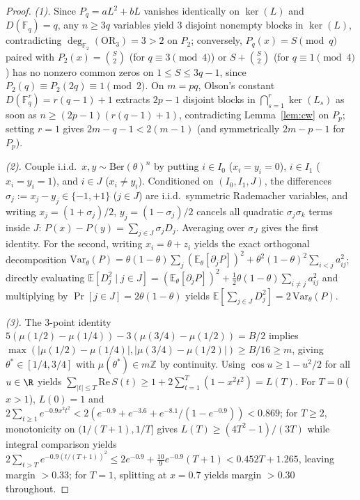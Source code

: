 \documentclass[11pt,a4paper]{article}
\theoremstyle{definition}
\newcommand{\F}{\mathbb{F}}
\newcommand{\Z}{\mathbb{Z}}
\newcommand{\OR}{\mathrm{OR}}
\begin{document}
\begin{proof}
\emph{(1).} Since $P_q = a L^2 + b L$ vanishes identically on $\ker(L)$ and $D(\F_q) = q$, any $n \ge 3q$ variables yield $3$ disjoint nonempty blocks in $\ker(L)$, contradicting $\deg_{\F_2}(\OR_3) = 3 > 2$ on $P_2$; conversely, $P_q(x) = S \pmod q$ paired with $P_2(x) = \binom{S}{2}$ (for $q \equiv 3 \pmod 4$) or $S + \binom{S}{2}$ (for $q \equiv 1 \pmod 4$) has no nonzero common zeros on $1 \le S \le 3q - 1$, since $P_2(q) \equiv P_2(2q) \equiv 1 \pmod 2$. On $m = pq$, Olson's constant $D(\F_q^r) = r(q - 1) + 1$ extracts $2p - 1$ disjoint blocks in $\bigcap_{s=1}^r \ker(L_s)$ as soon as $n \ge (2p - 1)(r(q - 1) + 1)$, contradicting Lemma~\ref{lem:cw} on $P_p$; setting $r = 1$ gives $2m - q - 1 < 2(m - 1)$ (and symmetrically $2m - p - 1$ for $P_p$).

\emph{(2).} Couple i.i.d.\ $x, y \sim \mathrm{Ber}(\theta)^n$ by putting $i \in I_0$ ($x_i = y_i = 0$), $i \in I_1$ ($x_i = y_i = 1$), and $i \in J$ ($x_i \ne y_i$). Conditioned on $(I_0, I_1, J)$, the differences $\sigma_j := x_j - y_j \in \{-1, +1\}$ ($j \in J$) are i.i.d.\ symmetric Rademacher variables, and writing $x_j = (1 + \sigma_j)/2$, $y_j = (1 - \sigma_j)/2$ cancels all quadratic $\sigma_j\sigma_k$ terms inside $J$: $P(x) - P(y) = \sum_{j \in J} \sigma_j D_j$. Averaging over $\sigma_J$ gives the first identity. For the second, writing $x_i = \theta + z_i$ yields the exact orthogonal decomposition $\mathrm{Var}_\theta(P) = \theta(1-\theta)\sum_j (\mathbb{E}_\theta[\partial_j P])^2 + \theta^2(1-\theta)^2 \sum_{i<j} a_{ij}^2$; directly evaluating $\mathbb{E}[D_j^2 \mid j \in J] = (\mathbb{E}_\theta[\partial_j P])^2 + \frac{1}{2}\theta(1-\theta)\sum_{i\ne j} a_{ij}^2$ and multiplying by $\Pr[j \in J] = 2\theta(1-\theta)$ yields $\mathbb{E}[\sum_{j \in J} D_j^2] = 2\,\mathrm{Var}_\theta(P)$.

\emph{(3).} The $3$-point identity $5(\mu(1/2) - \mu(1/4)) - 3(\mu(3/4) - \mu(1/2)) = B/2$ implies $\max(|\mu(1/2)-\mu(1/4)|, |\mu(3/4)-\mu(1/2)|) \ge B/16 \ge m$, giving $\theta^* \in [1/4, 3/4]$ with $\mu(\theta^*) \in m\Z$ by continuity. Using $\cos u \ge 1 - u^2/2$ for all $u \in \R$ yields $\sum_{|t| \le T} \mathrm{Re}\, S(t) \ge 1 + 2\sum_{t=1}^T (1 - x^2 t^2) = L(T)$. For $T = 0$ ($x > 1$), $L(0) = 1$ and $2\sum_{t \ge 1} e^{-0.9 x^2 t^2} < 2(e^{-0.9} + e^{-3.6} + e^{-8.1}/(1-e^{-0.9})) < 0.869$; for $T \ge 2$, monotonicity on $(1/(T+1), 1/T]$ gives $L(T) \ge (4T^2 - 1)/(3T)$ while integral comparison yields $2\sum_{t > T} e^{-0.9 (t/(T+1))^2} \le 2 e^{-0.9} + \frac{10}{9} e^{-0.9}(T+1) < 0.452 T + 1.265$, leaving margin $> 0.33$; for $T = 1$, splitting at $x = 0.7$ yields margin $> 0.30$ throughout.


\end{proof}
\end{document}
